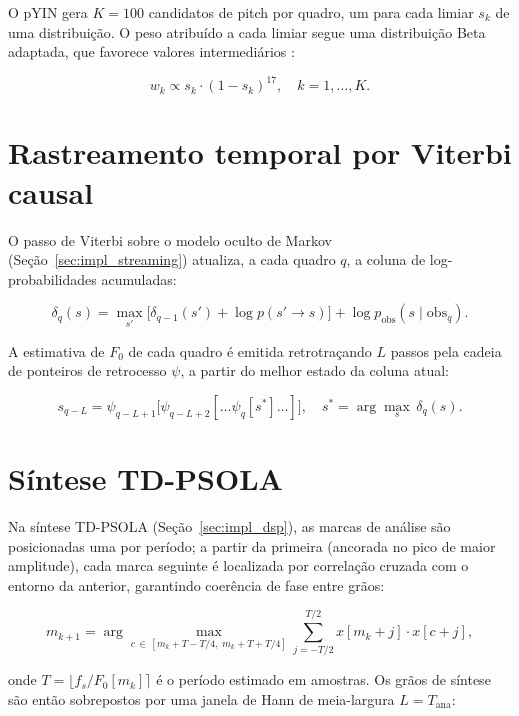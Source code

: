 O pYIN gera $K = 100$ candidatos de pitch por quadro, um para cada limiar $s_k$ de
uma distribuição. O peso atribuído a cada limiar segue uma distribuição Beta
adaptada, que favorece valores intermediários \cite{mauch2014pyin}:

\begin{equation}
w_k \propto s_k \cdot (1 - s_k)^{17}, \quad k = 1, \ldots, K .
\end{equation}

\section{\label{ap:viterbi}Rastreamento temporal por Viterbi causal}

O passo de Viterbi sobre o modelo oculto de Markov (Seção~\ref{sec:impl_streaming})
atualiza, a cada quadro $q$, a coluna de log-probabilidades acumuladas:

\begin{equation}
\delta_q(s) = \max_{s'} \bigl[\delta_{q-1}(s') + \log p(s' \to s)\bigr]
            + \log p_{\text{obs}}(s \mid \text{obs}_q).
\end{equation}

A estimativa de $F_0$ de cada quadro é emitida retrotraçando $L$ passos pela cadeia
de ponteiros de retrocesso $\psi$, a partir do melhor estado da coluna atual:

\begin{equation}
s_{q-L} = \psi_{q-L+1}\bigl[\psi_{q-L+2}[\ldots\psi_q[s^*]\ldots]\bigr],
\quad s^* = \arg\max_s \,\delta_q(s).
\end{equation}

\section{\label{ap:psola}Síntese TD-PSOLA}

Na síntese TD-PSOLA (Seção~\ref{sec:impl_dsp}), as marcas de análise são posicionadas
uma por período; a partir da primeira (ancorada no pico de maior amplitude), cada
marca seguinte é localizada por correlação cruzada com o entorno da anterior,
garantindo coerência de fase entre grãos:

\begin{equation}
m_{k+1} = \arg\max_{c \,\in\, [m_k + T - T/4,\; m_k + T + T/4]}
          \sum_{j=-T/2}^{T/2} x[m_k + j] \cdot x[c + j],
\end{equation}

\noindent onde $T = \lfloor f_s / F_0[m_k] \rceil$ é o período estimado em amostras.
Os grãos de síntese são então sobrepostos por uma janela de Hann de meia-largura
$L = T_{\text{ana}}$:

